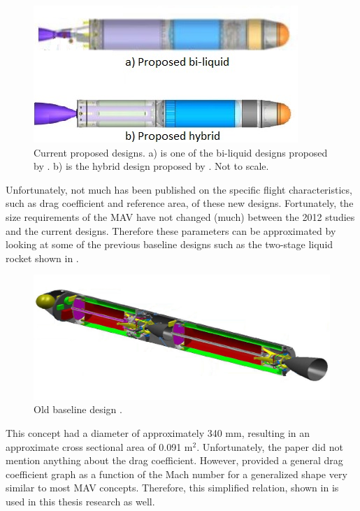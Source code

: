 \begin{figure}[H]
\centering
\includegraphics[width=0.5 \textwidth]{figures/heritage/biPropellantSSTOMAV_vaughan2016technology-And-hybridSSTOMAV_karp2016technology.jpg}
\caption{Current proposed designs. a) is one of the bi-liquid designs proposed by \cite{vaughan2016technology}. b) is the hybrid design proposed by \cite{karp2016technology}. Not to scale.}
\label{fig:biPropellantSSTOMAV_vaughan2016technology-And-hybridSSTOMAV_karp2016technology}
\end{figure}


\noindent
Unfortunately, not much has been published on the specific flight characteristics, such as drag coefficient and reference area, of these new designs. Fortunately, the size requirements of the \ac{MAV} have not changed (much) between the 2012 studies and the current designs. Therefore these parameters can be approximated by looking at some of the previous baseline designs such as the two-stage liquid rocket shown in . 


\begin{figure}[H]
\centering
\includegraphics[width=0.5 \textwidth]{figures/launcher_methods/baseline_liquid2_trinidad2012.jpg}
\caption{Old baseline design \citep{trinidad2012}.}
\label{fig:baseline_liquid2_trinidad2012}
\end{figure}

\noindent
This concept had a diameter of approximately 340 mm, resulting in an approximate cross sectional area of 0.091 m$^{2}$. Unfortunately, the paper did not mention anything about the drag coefficient. However, \cite{whitehead2004mars} provided a general drag coefficient graph as a function of the Mach number for a generalized shape very similar to most \ac{MAV} concepts. Therefore, this simplified relation, shown in  is used in this thesis research as well.

